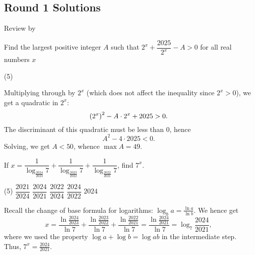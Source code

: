 \subsection{Round 1 Solutions}\label{S::2024-S-1}

\begin{resources}
    Review by 
\end{resources}

\begin{question}[D]\label{Q::2024-S-1-1}
    Find the largest positive integer $A$ such that $2^x + \dfrac{2025}{2^x} - A > 0$ for all real numbers $x$

    \begin{tasks}(5)
    \end{tasks}
\end{question}
\begin{solution*}
    Multiplying through by $2^x$ (which does not affect the inequality since $2^x > 0$), we get a quadratic in $2^x$: \[\left( 2^x \right)^2 - A \cdot 2^x + 2025 > 0.\] The discriminant of this quadratic must be less than 0, hence \[A^2 - 4 \cdot 2025 < 0.\] Solving, we get $A < 50$, whence $\max A = 49$.
\end{solution*}

\begin{question}[B]\label{Q::2024-S-1-2}
    If $x = \dfrac{1}{\log_{\frac{2024}{2023}} 7} + \dfrac{1}{\log_{\frac{2023}{2022}} 7} + \dfrac{1}{\log_{\frac{2022}{2021}} 7}$, find $7^x$.

    \begin{tasks}(5)
        \task $\dfrac{2021}{2024}$
        \task $\dfrac{2024}{2021}$
        \task $\dfrac{2022}{2024}$
        \task $\dfrac{2024}{2022}$
        \task $2024$
    \end{tasks}
\end{question}
\begin{solution*}
    Recall the change of base formula for logarithms: $\log_b a = \frac{\ln a}{\ln b}$. We hence get \[x = \frac{\ln \frac{2024}{2023}}{\ln 7} + \frac{\ln \frac{2023}{2022}}{\ln 7} + \frac{\ln \frac{2022}{2021}}{\ln 7} = \frac{\ln \frac{2024}{2021}}{\ln 7} = \log_7 \frac{2024}{2021},\] where we used the property $\log a + \log b = \log ab$ in the intermediate step. Thus, $7^x = \frac{2024}{2021}$.
\end{solution*}


